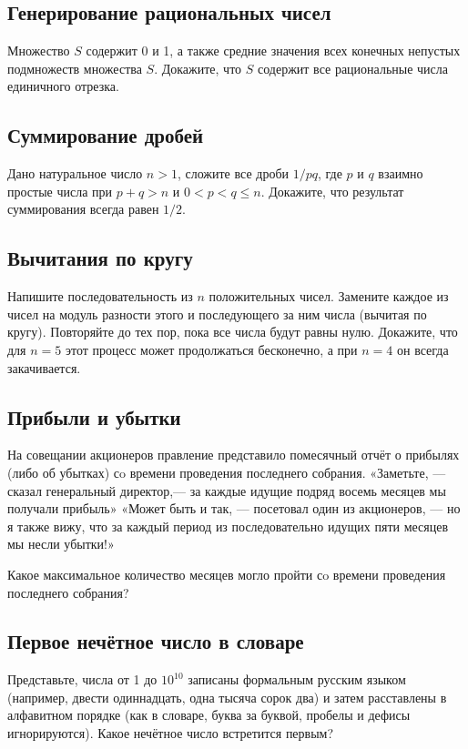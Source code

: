 \subsection*{Генерирование рациональных чисел}%


Множество $S$ содержит 0 и 1, а также средние значения всех конечных непустых подмножеств множества $S$.  
Докажите, что  $S$  содержит все рациональные числа единичного отрезка.



\subsection*{Суммирование дробей}%


Дано натуральное число $n>1$, 
сложите все дроби $1/pq$, где $p$ и $q$ взаимно простые числа при $p+q>n$ и $0<p<q\le n$. 
Докажите, что результат суммирования всегда равен $1/2$.



\subsection*{Вычитания по кругу}


Напишите последовательность из $n$  положительных чисел. 
Замените каждое из чисел на модуль разности %
этого и последующего за ним числа  (вычитая по кругу). 
Повторяйте до тех пор, пока все числа будут равны нулю. 
Докажите, что для  $n=5$  этот  процесс может продолжаться бесконечно, 
а при $n=4$ он всегда закачивается.



\subsection*{Прибыли и убытки}%


На совещании акционеров правление представило помесячный отчёт о прибылях (либо об убытках) сo времени проведения последнего собрания.  «Заметьте, --- сказал генеральный директор,--- за каждые идущие подряд восемь месяцев мы получали прибыль»
«Может быть и так, --- посетовал один из акционеров, --- но я также вижу, что за каждый период из последовательно идущих пяти месяцев мы несли убытки!»

Какое максимальное количество месяцев могло пройти сo времени проведения последнего собрания?




\subsection*{Первое нечётное число в словаре}%


Представьте, числа от 1 до $10^{10}$ записаны формальным русским языком (например, двести одиннадцать, одна тысяча сорок два) и затем расставлены в алфавитном порядке (как в словаре, буква за буквой, пробелы и дефисы игнорируются).  
Какое нечётное число встретится первым?